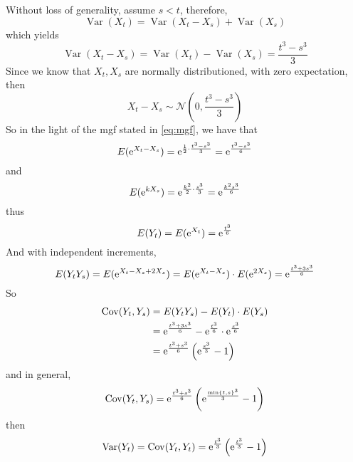 \documentclass{homework}
\DeclareMathOperator{\var}{Var}
\DeclareMathOperator{\cov}{Cov}
\begin{document}
    Without loss of generality, assume $s<t$,
    therefore,
    \[\var(X_t)=\var(X_t-X_s)+\var(X_s)\]
    which yields
    \[\var(X_t-X_s)=\var(X_t)-\var(X_s)=\frac{t^3-s^3}{3}\]
    Since we know that $X_t,X_s$ are normally distributioned,
    with zero expectation, then
    \[X_t-X_s\sim\mathcal N\left(0,\frac{t^3-s^3}{3}\right)\]
    So in the light of the mgf stated in \cref{eq:mgf}, we have that
    \[E(\mathrm e^{X_t-X_s})=\mathrm e^{\frac{1}{2}\cdot\frac{t^3-s^3}{3}}
    =\mathrm e^{\frac{t^3-s^3}{6}}\]
    and
    \[E(\mathrm e^{kX_s})=\mathrm e^{\frac{k^2}{2}\cdot\frac{s^3}{3}}
    =\mathrm e^{\frac{k^2s^3}{6}}\]
    thus
    \[E(Y_t)=E(\mathrm e^{X_t})=\mathrm e^{\frac{t^3}{6}}\]
    And with independent increments,
    \[E(Y_tY_s)=E(\mathrm e^{X_t-X_s+2X_s})
    =E(\mathrm e^{X_t-X_s})\cdot E(\mathrm e^{2X_s})
    =\mathrm e^{\frac{t^3+3s^3}{6}}\]
    So
    \[\begin{aligned}
        \cov(Y_t,Y_s)&=E(Y_tY_s)-E(Y_t)\cdot E(Y_s)\\
        &=\e^{\frac{t^3+3s^3}{6}}-\e^{\frac{t^3}{6}}\cdot\e^\frac{s^3}{6}\\
        &=\e^{\frac{t^3+s^3}{6}}\left(\e^{\frac{s^3}{3}}-1\right)
    \end{aligned}\]
    and in general,
    \[\cov(Y_t,Y_s)=\e^{\frac{t^3+s^3}{6}}
    \left(\e^{\frac{\min\{t,s\}^3}{3}}-1\right)\]
    then
    \[\var(Y_t)=\cov(Y_t,Y_t)
    =\e^{\frac{t^3}{3}}\left(\e^{\frac{t^3}{3}}-1\right)\]
\end{document}
